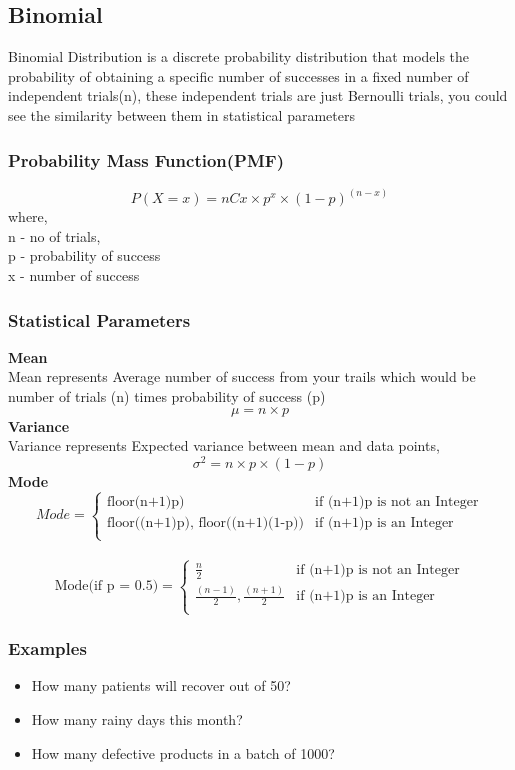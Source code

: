 \documentclass[12pt]{extarticle}
\begin{document}
\subsection{Binomial}
Binomial Distribution is a discrete probability distribution that models the probability of obtaining a specific number of successes
in a fixed number of independent trials(n), these independent trials are just Bernoulli trials, you could see the similarity between
them in statistical parameters

\subsubsection{Probability Mass Function(PMF)}

$$ P(X=x) = nCx \times p^x \times (1-p)^{(n-x)} $$
where,\\
n - no of trials,\\ 
p - probability of success\\
x - number of success\\

\subsubsection{Statistical Parameters}
\textbf{Mean}\\
Mean represents Average number of success from your trails which would be number of trials (n) times probability of success (p)
$$ \mu = n \times p $$
\textbf{Variance}\\
Variance represents Expected variance between mean and data points,
$$ \sigma^2 = n \times p \times (1-p) $$
\textbf{Mode}\\
$$ Mode = 
\begin{cases}
  \text{floor(n+1)p)} & \text{if (n+1)p is not an Integer} \\
  \text{floor((n+1)p), floor((n+1)(1-p))} & \text{if (n+1)p is an Integer} \\
\end{cases}$$ \\
$$ \text{Mode(if p = 0.5)} = 
\begin{cases}
  \frac{n}{2} & \text{if (n+1)p is not an Integer} \\
  \frac{(n-1)}{2},\frac{(n+1)}{2} & \text{if (n+1)p is an Integer} \\
\end{cases}
$$
\subsubsection{Examples}
\begin{itemize}
    \item How many patients will recover out of 50?
    \item How many rainy days this month?
    \item How many defective products in a batch of 1000?
\end{itemize}
\end{document}
